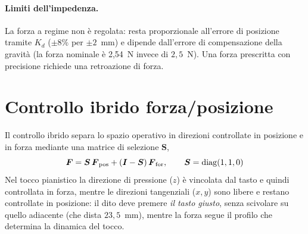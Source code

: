 \paragraph{Limiti dell'impedenza.} La forza a regime non è regolata: resta proporzionale all'errore di posizione tramite $K_d$ ($\pm8\%$ per $\pm2$~mm) e dipende dall'errore di compensazione della gravità (la forza nominale è 2,54~N invece di $2{,}5$~N). Una forza prescritta con precisione richiede una retroazione di forza.

\section{Controllo ibrido forza/posizione}
\label{sec:ctrl_ibrido}

Il controllo ibrido separa lo spazio operativo in direzioni controllate in posizione e in forza mediante una matrice di selezione $\boldsymbol S$,
\begin{equation}
    \boldsymbol F=\boldsymbol S\,\boldsymbol F_{\rm pos}+(\boldsymbol I-\boldsymbol S)\,\boldsymbol F_{\rm for},\qquad \boldsymbol S=\mathrm{diag}(1,1,0)
    \label{eq:hybrid}
\end{equation}
Nel tocco pianistico la direzione di pressione ($z$) è vincolata dal tasto e quindi controllata in forza, mentre le direzioni tangenziali ($x,y$) sono libere e restano controllate in posizione: il dito deve premere \emph{il tasto giusto}, senza scivolare su quello adiacente (che dista $23{,}5$~mm), mentre la forza segue il profilo che determina la dinamica del tocco.

